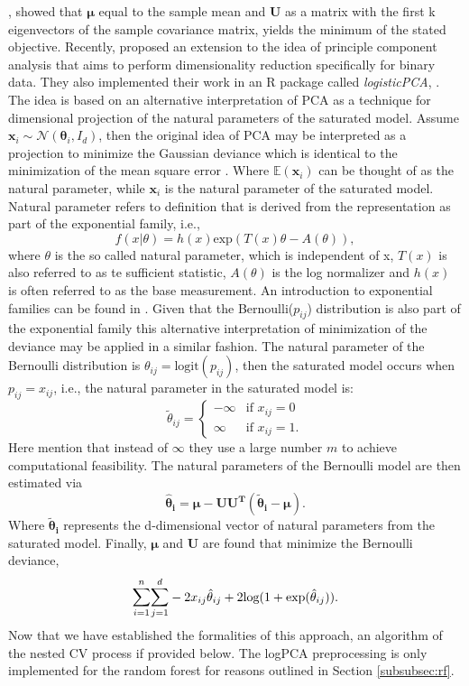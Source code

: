 \documentclass[a4paper,12pt, headsepline]{scrartcl}
\numberwithin{equation}{section}
\begin{document}
\citet{pearson01}, showed that $\bm \mu$ equal to the sample mean and $\bm U$ as a matrix with the first k eigenvectors of the sample covariance matrix, yields the minimum of the stated objective. Recently, \citet{landgraf2020} proposed an extension to the idea of principle component analysis that aims to perform dimensionality reduction specifically for binary data. They also implemented their work in an R package called \textit{logisticPCA}, \citet{logPCA}. The idea is based on an alternative interpretation of PCA as a technique for dimensional projection of the natural parameters of the saturated model. Assume $\bm x_{i} \sim \mathcal{N}(\bm \theta_i, I_d)$, then the original idea of PCA may be interpreted as a projection to minimize the Gaussian deviance which is identical to the minimization of the mean square error  \citep{collins01}. Where $\mathbb{E}(\bm x_i)$ can be thought of as the natural parameter, while $\bm x_i$ is the natural parameter of the saturated model. Natural parameter refers to definition that is derived from the representation as part of the exponential family, i.e., 
\[
f(x|\theta) = h(x) \text{exp}(T(x)\theta-A(\theta)),
\]
where $\theta$ is the so called natural parameter, which is independent of x, $T(x)$ is also referred to as te sufficient statistic, $A(\theta)$ is the log normalizer and $h(x)$ is often referred to as the base measurement. An introduction to exponential families can be found in \citet{case01}. Given that the Bernoulli($p_{ij}$) distribution is also part of the exponential family this alternative interpretation of minimization of the deviance may be applied in a similar fashion. The natural parameter of the Bernoulli distribution is $\theta_{ij} = \text{logit}(p_{ij})$, then the saturated model occurs when $p_{ij} = x_{ij}$, i.e., the natural parameter in the saturated model is:
\begin{equation}
	\tilde{\theta}_{ij} =
	\begin{cases}
		-\infty & \text{if } x_{ij} = 0\\
		\infty & \text{if } x_{ij} = 1.
	\end{cases} 
\end{equation}
Here \citet{landgraf2020} mention that instead of $\infty$ they use a large number $m$ to achieve computational feasibility. The natural parameters of the Bernoulli model are then estimated via
\[
\bm{\hat \theta_i} =  \bm{\mu - UU^T(\tilde{\theta}_i-\mu)}.
\]
Where $\bm{\tilde{\theta}_i}$ represents the d-dimensional vector of natural parameters from the saturated model. Finally, $\bm \mu$ and $\bm U$ are found that minimize the Bernoulli deviance,
\[
 \mathlarger{\sum}\limits_{i = 1}^{n} \mathlarger{\sum}\limits_{j = 1}^{d} -2x_{ij}\hat{\theta}_{ij} + 2\text{log}(1 + \text{exp}(\hat{\theta}_{ij})).
\]
Now that we have established the formalities of this approach, an algorithm of the nested CV process if provided below. The logPCA preprocessing is only implemented for the random forest for reasons outlined in Section \ref{subsubsec:rf}.
\end{document}
